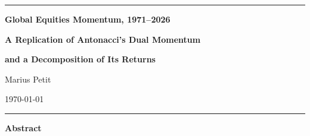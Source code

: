 \documentclass[11pt,a4paper]{article}
\begin{document}
\thispagestyle{empty}

\noindent\rule{\textwidth}{0.9pt}

\vspace{1.6em}
\begin{center}
  {\LARGE\bfseries Global Equities Momentum, 1971--2026\par}
  \vspace{0.45em}
  {\Large\bfseries A Replication of Antonacci's Dual Momentum\par}
  \vspace{0.2em}
  {\Large\bfseries and a Decomposition of Its Returns\par}

  \vspace{2.2em}
  {\Large Marius Petit\footnotemark[1]\par}

  \vspace{1.6em}
  {\normalsize \today\par}
\end{center}
\vspace{1.4em}

\noindent\rule{\textwidth}{0.9pt}

\vspace{1.8em}
\begin{center}\textbf{Abstract}\end{center}
\vspace{0.4em}
\end{document}
